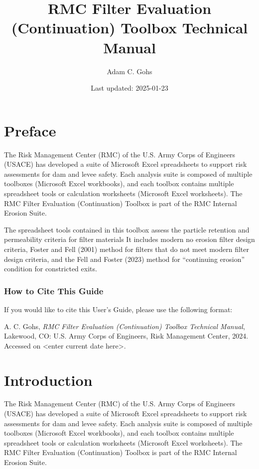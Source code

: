 \documentclass[
]{book}
\title{RMC Filter Evaluation (Continuation) Toolbox Technical Manual}
\author{Adam C. Gohs}
\date{Last updated: 2025-01-23}
\newenvironment{citation-note}
    {\begin{quote}\itshape}
    {\end{quote}}
\begin{document}
\maketitle

{
\setcounter{tocdepth}{1}
\tableofcontents
}
\chapter*{Preface}\label{preface}

The Risk Management Center (RMC) of the U.S. Army Corps of Engineers (USACE) has developed a suite of Microsoft Excel spreadsheets to support risk assessments for dam and levee safety. Each analysis suite is composed of multiple toolboxes (Microsoft Excel workbooks), and each toolbox contains multiple spreadsheet tools or calculation worksheets (Microsoft Excel worksheets). The RMC Filter Evaluation (Continuation) Toolbox is part of the RMC Internal Erosion Suite.

The spreadsheet tools contained in this toolbox assess the particle retention and permeability criteria for filter materials It includes modern no erosion filter design criteria, Foster and Fell (2001) method for filters that do not meet modern filter design criteria, and the Fell and Foster (2023) method for ``continuing erosion'' condition for constricted exits.

\subsection*{How to Cite This Guide}\label{how-to-cite-this-guide}

If you would like to cite this User's Guide, please use the following format:

\begin{citation-note}
A. C. Gohs, \emph{RMC Filter Evaluation (Continuation) Toolbox Technical
Manual}, Lakewood, CO: U.S. Army Corps of Engineers, Risk Management
Center, 2024. Accessed on {\textless enter current date
here\textgreater{}}.
\end{citation-note}

\chapter{Introduction}\label{introduction}

The Risk Management Center (RMC) of the U.S. Army Corps of Engineers (USACE) has developed a suite of Microsoft Excel spreadsheets to support risk assessments for dam and levee safety. Each analysis suite is composed of multiple toolboxes (Microsoft Excel workbooks), and each toolbox contains multiple spreadsheet tools or calculation worksheets (Microsoft Excel worksheets). The RMC Filter Evaluation (Continuation) Toolbox is part of the RMC Internal Erosion Suite.
\end{document}
